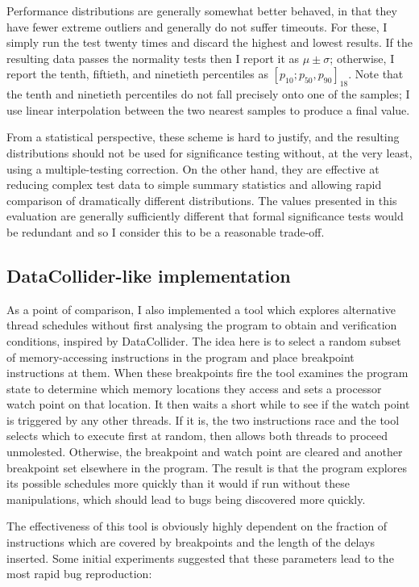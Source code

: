 Performance distributions are generally somewhat better behaved, in
that they have fewer extreme outliers and generally do not suffer
timeouts.  For these, I simply run the test twenty times and discard
the highest and lowest results.  If the resulting data passes the
normality tests then I report it as $\mu \pm \sigma$; otherwise, I
report the tenth, fiftieth, and ninetieth percentiles as $[p_{10};
  p_{50}, p_{90}]_{18}$.  Note that the tenth and ninetieth
percentiles do not fall precisely onto one of the samples; I use
linear interpolation between the two nearest samples to produce a
final value.

From a statistical perspective, these scheme is hard to justify, and
the resulting distributions should not be used for significance
testing without, at the very least, using a multiple-testing
correction.  On the other hand, they are effective at reducing complex
test data to simple summary statistics and allowing rapid comparison
of dramatically different distributions.  The values presented in this
evaluation are generally sufficiently different that formal
significance tests would be redundant and so I consider this to be a
reasonable trade-off.

\subsection{DataCollider-like implementation}

As a point of comparison, I also implemented a tool which explores
alternative thread schedules without first analysing the program to
obtain {\StateMachines} and verification conditions, inspired by
DataCollider\needCite{}.  The idea here is to select a random subset
of memory-accessing instructions in the program and place breakpoint
instructions at them.  When these breakpoints fire the tool examines
the program state to determine which memory locations they access and
sets a processor watch point\needCite{} on that location.  It then
waits a short while to see if the watch point is triggered by any
other threads.  If it is, the two instructions race and the tool
selects which to execute first at random, then allows both threads to
proceed unmolested.  Otherwise, the breakpoint and watch point are
cleared and another breakpoint set elsewhere in the program.  The
result is that the program explores its possible schedules more
quickly than it would if run without these manipulations, which should
lead to bugs being discovered more quickly.

The effectiveness of this tool is obviously highly dependent on the
fraction of instructions which are covered by breakpoints and the
length of the delays inserted.  Some initial experiments suggested
that these parameters lead to the most rapid bug
reproduction:

